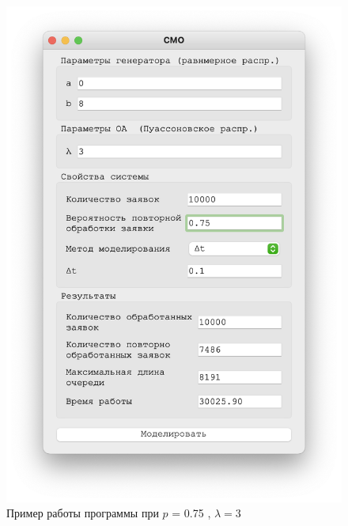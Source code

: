 \begin{figure}[!htb]
\begin{minipage}{0.55\textwidth}
      \includegraphics[width=1\linewidth]{3-75-t}
    \end{minipage}
    \caption{Пример работы программы при $p$ = 0.75 , $\lambda = 3$}
 \end{figure}



